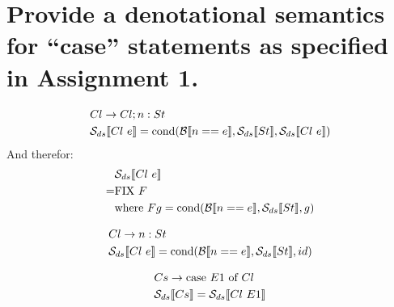 \section{Provide a denotational semantics for ``case'' statements as specified in Assignment 1.}
\begin{align}
	&	Cl \rightarrow Cl; n : St \\
	& \mathcal{S}_{ds}\llbracket Cl\text{ }e \rrbracket = \text{cond}(\mathcal{B}\llbracket n==e \rrbracket, \mathcal{S}_{ds}\llbracket St \rrbracket, \mathcal{S}_{ds}\llbracket Cl\text{ }e \rrbracket)
\end{align}
And therefor:
\begin{align}
	& \mathcal{S}_{ds}\llbracket Cl\text{ }e \rrbracket \\
= & \text{FIX } F \\
	& \text{where } F g = \text{cond}(\mathcal{B}\llbracket n==e \rrbracket, \mathcal{S}_{ds}\llbracket St \rrbracket, g) 
\end{align}

\begin{align}
	& Cl \rightarrow n : St \\
	& \mathcal{S}_{ds}\llbracket Cl\text{ }e \rrbracket = \text{cond}(\mathcal{B}\llbracket n==e \rrbracket, \mathcal{S}_{ds}\llbracket St \rrbracket, id)
\end{align}

\begin{align}
	& Cs \rightarrow \text{case } E1\text{ of }Cl \\
	& \mathcal{S}_{ds}\llbracket Cs \rrbracket = \mathcal{S}_{ds}\llbracket Cl\text{ }E1 \rrbracket
\end{align}

%
%
%
%
%
%
